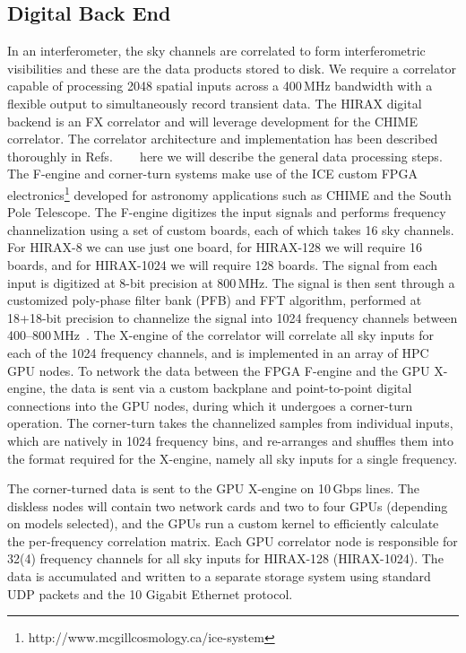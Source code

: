 \documentclass[]{spie}  %
\begin{document}
\subsection{Digital Back End}

In an interferometer, the sky channels are correlated to form interferometric visibilities and these are the data products stored to disk. We require a correlator capable of processing 2048 spatial inputs across a 400\,MHz bandwidth with a flexible output to simultaneously record transient data. The HIRAX digital backend is an FX correlator and will leverage development for the CHIME correlator. The correlator architecture and implementation has been described thoroughly in Refs. ~\cite{2015arXiv150306202D}~\cite{2015arXiv150306203K}~\cite{2015arXiv150306189R} here we will describe the general data processing steps. The F-engine and corner-turn systems make use of the ICE custom FPGA electronics\footnote{http:\//\//www.mcgillcosmology.ca\//ice-system} developed for astronomy applications such as CHIME and the South Pole Telescope. The F-engine digitizes the input signals and performs frequency channelization using a set of custom boards, each of which takes 16 sky channels. For HIRAX-8 we can use just one board, for HIRAX-128 we will require 16 boards, and for HIRAX-1024 we will require 128 boards. The signal from each input is digitized at 8-bit precision at 800\,MHz. The signal is then sent through a customized poly-phase filter bank (PFB) and FFT algorithm, performed at 18+18-bit precision to channelize the signal into 1024 frequency channels between 400--800\,MHz~\cite{ICEboard}. The X-engine of the correlator will correlate all sky inputs for each of the 1024 frequency channels, and is implemented in an array of HPC GPU nodes. To network the data between the FPGA F-engine and the GPU X-engine, the data is sent via a custom backplane and point-to-point digital connections into the GPU nodes, during which it undergoes a corner-turn operation. The corner-turn takes the channelized samples from individual inputs, which are natively in 1024 frequency bins, and re-arranges and shuffles them into the format required for the X-engine, namely all sky inputs for a single frequency. \newline

The corner-turned data is sent to the GPU X-engine on 10\,Gbps lines. The diskless nodes will contain two network cards and two to four GPUs (depending on models selected), and the GPUs run a custom kernel to efficiently calculate the per-frequency correlation matrix. Each GPU correlator node is responsible for 32(4) frequency channels for all sky inputs for HIRAX-128 (HIRAX-1024). The data is accumulated and written to a separate storage system using standard UDP packets and the 10 Gigabit Ethernet protocol. \newline
\end{document}
